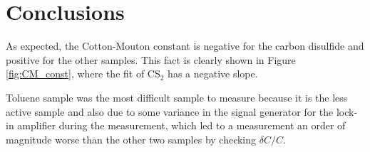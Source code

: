\documentclass[11pt,a4paper]{article}
\begin{document}
\section{Conclusions}
As expected, the Cotton-Mouton constant is negative for the carbon disulfide and positive for the other samples. This fact is clearly shown in Figure \ref{fig:CM_const}, where the fit of CS$_2$ has a negative slope.

Toluene sample was the most difficult sample to measure because it is the less active sample and also due to some variance in the signal generator for the lock-in amplifier during the measurement, which led to a measurement an order of magnitude worse than the other two samples by checking $\delta C/C$.




\newpage
{\color{white}\cite{wilson1997simple}\cite{note19923}\cite{montarou2004two}\cite{freiser1968survey}}


\end{document}
